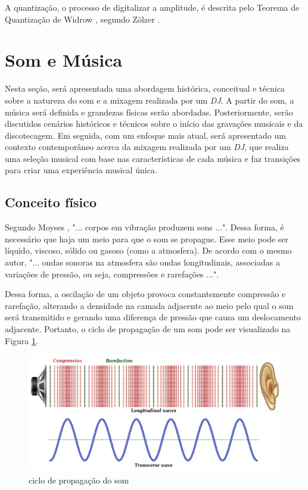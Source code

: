 A quantização, o processo de digitalizar a amplitude, é descrita pelo Teorema de Quantização de Widrow \cite{widrow}, segundo Zölzer \cite{zolzer2008digital}.

\section{Som e Música}
Nesta seção, será apresentada uma abordagem histórica, conceitual e técnica sobre a natureza do som e a mixagem realizada por um \textit{DJ}. A partir do som, a música será definida e grandezas físicas serão abordadas. Posteriormente, serão discutidos cenários históricos e técnicos sobre o início das gravações musicais e da discotecagem. Em seguida, com um enfoque mais atual, será apresentado um contexto contemporâneo acerca da mixagem realizada por um \textit{DJ}, que realiza uma seleção musical com base nas características de cada música e faz transições para criar uma experiência musical única.

\subsection{Conceito físico}
Segundo Moyses \cite{moyses}, "... corpos em vibração produzem sons ...". Dessa forma, é necessário que haja um meio para que o som se propague. Esse meio pode ser líquido, viscoso, sólido ou gasoso (como a atmosfera). De acordo com o mesmo autor, "... ondas sonoras na atmosfera são ondas longitudinais, associadas a variações de pressão, ou seja, compressões e rarefações ...". \par Dessa forma, a oscilação de um objeto provoca constantemente compressão e rarefação, alterando a densidade na camada adjacente ao meio pelo qual o som será transmitido e gerando uma diferença de pressão que causa um deslocamento adjacente. Portanto, o ciclo de propagação de um som pode ser visualizado na Figura \ref{fig07}.

\begin{figure}[h]
	\centering
    \includegraphics[scale=0.6]{figuras/fig07.png}
	\caption{ciclo de propagação do som \cite{shutterstock}}
	\label{fig07}
\end{figure}

